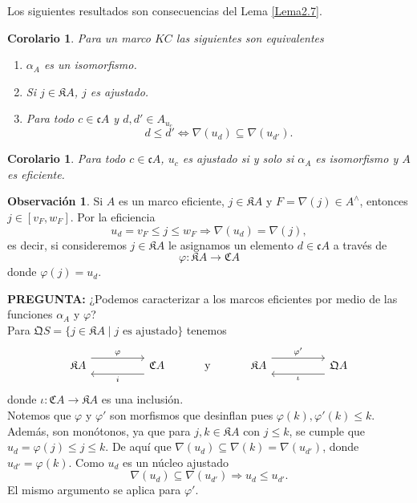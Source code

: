 \documentclass[11pt]{amsart}
\theoremstyle{plain}
\newtheorem{cor}[thm]{Corolario}
\theoremstyle{definition}
\newtheorem{obs}[thm]{Observación}
\begin{document}
Los siguientes resultados son consecuencias del Lema \ref{Lema2.7}.

\begin{cor}
        Para un marco $KC$ las siguientes son equivalentes
    \begin{enumerate}
        \item $\alpha_A$ es un isomorfismo.
        \item Si $j\in \mathfrak{K}A$, $j$ es ajustado.
        \item Para todo $c\in \mathfrak{c}A$ y $d, d'\in A_{u_c}$
        \[
            d\leq d'\Leftrightarrow \nabla(u_d)\subseteq \nabla(u_{d'}).
        \]
    \end{enumerate}
\end{cor}

\begin{cor}
    Para todo $c\in \mathfrak{c}A$, $u_c$ es ajustado si y solo si $\alpha_A$ es isomorfismo y $A$ es eficiente.
\end{cor}

\begin{obs}
Si $A$ es un marco eficiente, $j\in \mathfrak{K}A$ y $F=\nabla(j)\in A^\wedge$, entonces $j\in [v_F, w_F]$. Por la eficiencia  
\[
u_d=v_F\leq j\leq w_F\Rightarrow \nabla(u_d)=\nabla(j),
\]
es decir, si consideremos $j\in \mathfrak{K}A$ le asignamos un elemento $d\in \mathfrak{c}A$ a través de
\[
\varphi\colon\mathfrak{K}A\to \mathfrak{C}A
\]
donde $\varphi(j)=u_d$.

\end{obs}

\textbf{PREGUNTA:} ¿Podemos caracterizar a los marcos eficientes por medio de las funciones $\alpha_A$ y $\varphi$?\\

Para $\mathfrak{Q}S=\{j\in \mathfrak{K}A\mid j \mbox{ es ajustado}\}$ tenemos 
\[\begin{tikzcd}
	{\mathfrak{K}A} && {\mathfrak{C}A} & {\mbox{ y }} & {\mathfrak{K}A} && {\mathfrak{Q}A}
	\arrow["\varphi", shift left=3, from=1-1, to=1-3]
	\arrow["i", shift left=3, from=1-3, to=1-1]
	\arrow["{\varphi'}", shift left=3, from=1-5, to=1-7]
	\arrow["\iota", shift left=3, from=1-7, to=1-5]
\end{tikzcd}\]
donde $\iota\colon \mathfrak{C}A\to \mathfrak{K}A$ es una inclusión.\\

Notemos que $\varphi$ y $\varphi'$ son morfismos que desinflan pues $\varphi(k),\varphi'(k)\leq k$. Además, son monótonos, ya que para $j, k\in \mathfrak{K}A$ con $j\leq k$, se cumple que $u_d=\varphi(j)\leq j\leq k$. De aquí que $\nabla(u_d)\subseteq\nabla(k)=\nabla(u_{d'})$, donde $u_{d'}=\varphi(k)$. Como $u_d$ es un núcleo ajustado
\[
\nabla(u_d)\subseteq \nabla(u_{d'})\Rightarrow u_d\leq u_{d'}.
\]
El mismo argumento se aplica para $\varphi'$.\\
\end{document}
